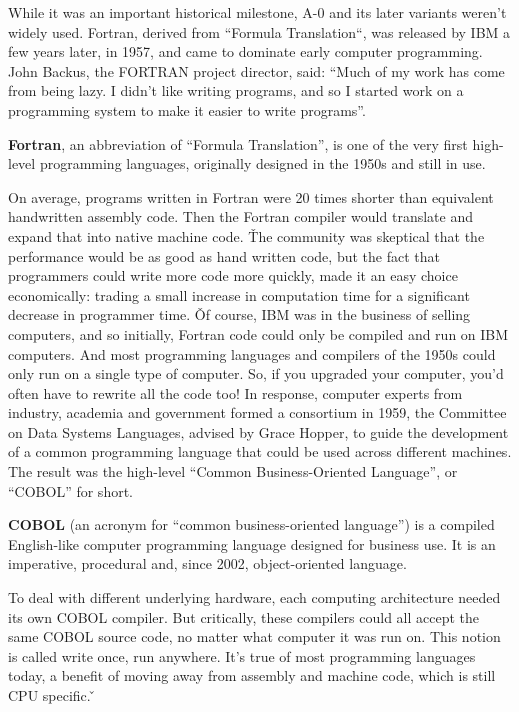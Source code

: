While it was an important historical milestone, A-0 and its later variants weren't widely used. Fortran, derived from
``Formula Translation``, was released by IBM a few years later, in 1957, and came to dominate early computer
programming. John Backus, the FORTRAN project director, said: ``Much of my work has come from being lazy. I didn't
like writing programs, and so I started work on a programming system to make it easier to write programs''.

\bd[Fortran]
\textbf{Fortran}, an abbreviation of ``Formula Translation'', is one of the very first high-level programming languages,
originally designed in the 1950s and still in use.
\ed

On average, programs written in Fortran were 20 times shorter than equivalent handwritten assembly code. Then the
Fortran compiler would translate and expand that into native machine code. \v

The community was skeptical that the performance would be as good as hand written code, but the fact that programmers
could write more code more quickly, made it an easy choice economically: trading a small increase in computation time
for a significant decrease in programmer time. \v

Of course, IBM was in the business of selling computers, and so initially, Fortran code could only be compiled and
run on IBM computers. And most programming languages and compilers of the 1950s could only run on a single type of
computer. So, if you upgraded your computer, you'd often have to rewrite all the code too! In response, computer
experts from industry, academia and government formed a consortium in 1959, the Committee on Data Systems Languages,
advised by Grace Hopper, to guide the development of a common programming language that could be used across
different machines. The result was the high-level ``Common Business-Oriented Language'', or ``COBOL'' for short.

\bd[COBOL]
\textbf{COBOL} (an acronym for ``common business-oriented language'') is a compiled English-like computer programming
language designed for business use. It is an imperative, procedural and, since 2002, object-oriented language.
\ed

To deal with different underlying hardware, each computing architecture needed its own COBOL compiler. But
critically, these compilers could all accept the same COBOL source code, no matter what computer it was run on. This
notion is called write once, run anywhere. It's true of most programming languages today, a benefit of moving away
from assembly and machine code, which is still CPU specific. \v

